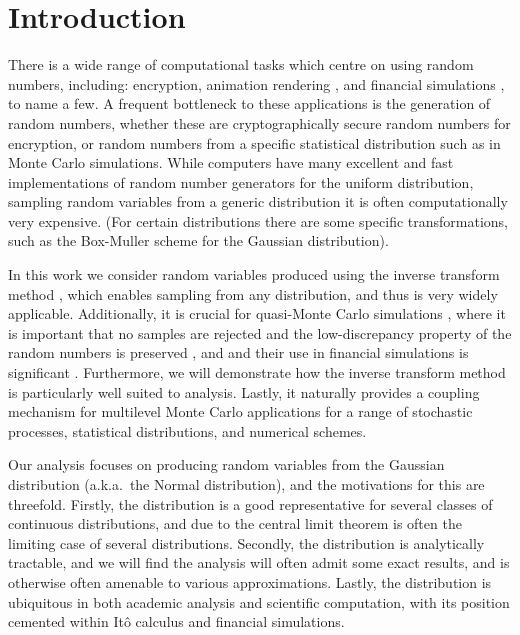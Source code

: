 \documentclass[manuscript,review]{acmart}
\begin{document}
\maketitle

\section{Introduction}
\label{sec:introduction}

There is a wide range of computational tasks which centre on using random numbers, including: encryption, animation rendering \citep{lee2017vectorized}, and financial simulations \citep{glasserman2013monte}, to name a few. A frequent bottleneck to these applications is the generation of random numbers, whether these are cryptographically secure random numbers for encryption, or random numbers from a specific statistical distribution such as in Monte Carlo simulations.  While computers have many excellent and fast implementations of random number generators for the uniform distribution, sampling random variables from a generic distribution it is often computationally very expensive. (For certain distributions there are some specific transformations, such as the Box-Muller scheme \citep{box1958note} for the Gaussian distribution). 

In this work we consider random variables produced using the inverse transform method \citep{glasserman2013monte}, which enables sampling from any distribution, and thus is very widely applicable. Additionally, it is crucial for quasi-Monte Carlo simulations \citep{giles2009multilevel_qmc,lecuyer2016randomized}, where it is important that no samples are rejected and the low-discrepancy property of the random numbers is preserved \citep{tezuka1995uniform}, and and their use in financial simulations is significant \citep{joy1996quasi,xu2015high}. Furthermore, we will demonstrate how the inverse transform method is particularly well suited to analysis. Lastly, it naturally provides a coupling mechanism for multilevel Monte Carlo applications for a range of stochastic processes, statistical distributions, and numerical schemes. 

Our analysis focuses on producing random variables from the Gaussian distribution (a.k.a.\ the Normal distribution), and the motivations for this are threefold. Firstly, the distribution is a good representative for several classes of continuous distributions, and due to the central limit theorem is often the limiting case of several distributions. Secondly, the distribution is analytically tractable, and we will find the analysis will often admit some exact results, and is otherwise often amenable to various approximations. Lastly, the distribution is ubiquitous in both academic analysis and scientific computation, with its position cemented within It\^{o} calculus and financial simulations. 
\end{document}
